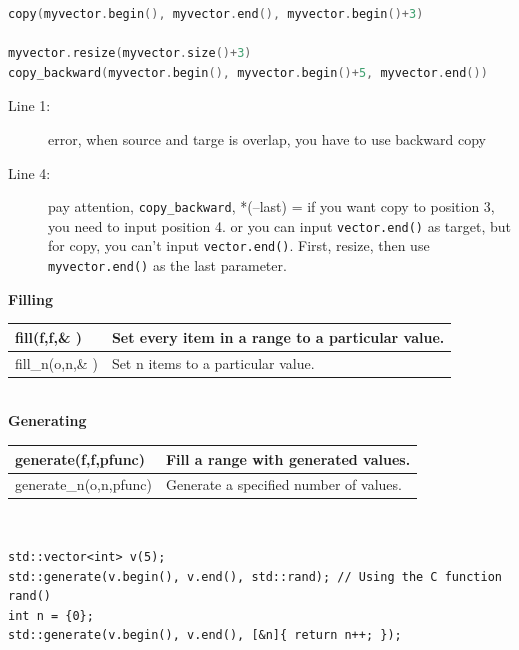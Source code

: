 \documentclass[a4paper,11pt,twoside]{book}
\newcommand{\tophline}{\hline }
\newcommand{\bottomhline}{\\ \hline }
\newcommand{\tophline}{ }
\newcommand{\bottomhline}{ }
\begin{document}
\begin{lstlisting}[frame=single, language=c++]
copy(myvector.begin(), myvector.end(), myvector.begin()+3) 

myvector.resize(myvector.size()+3)
copy_backward(myvector.begin(), myvector.begin()+5, myvector.end())
\end{lstlisting}
\begin{description}
	\item[Line 1:] error, when source and targe is overlap, you have to use backward copy
	\item[Line 4:]pay attention, \texttt{copy\_backward}, *(--last) = if you want copy to position 3, you need to input position 4. or you can input \texttt{vector.end()} as target, but for copy, you can't input \texttt{vector.end()}. First, resize, then use\texttt{ myvector.end()} as the last parameter.

\end{description} 

\textbf{Filling} \\
\begin{tabular}{| p{} |p{}|}
\tophline fill(f,f,\& ) & Set every item in a range to a particular value.  \\
\tophline fill\_n(o,n,\& )  & Set n items to a particular value.   \bottomhline
\end{tabular} \\


\textbf{Generating} \\
\begin{tabular}{| p{} |p{}|}
\tophline generate(f,f,pfunc)  & Fill a range with generated values.   \\
\tophline generate\_n(o,n,pfunc)  & Generate a specified number of values.   \bottomhline
\end{tabular} \\

\begin{lstlisting}[numbers=none]
std::vector<int> v(5);
std::generate(v.begin(), v.end(), std::rand); // Using the C function rand()
int n = {0};
std::generate(v.begin(), v.end(), [&n]{ return n++; });
\end{lstlisting}
\end{document}
